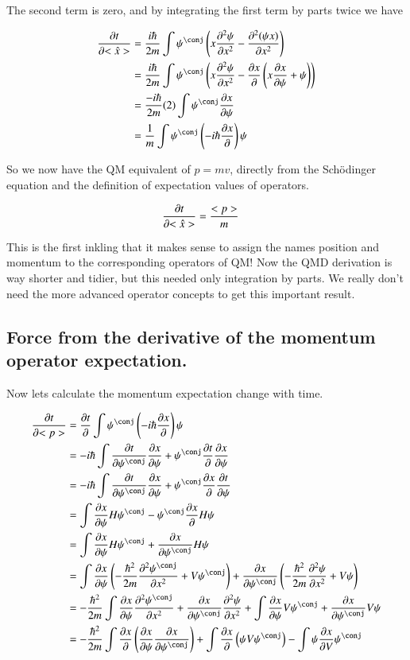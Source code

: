 \documentclass{article}
\newcommand{\PDSq}[2]{\frac{\partial^2 {#2}}{\partial {#1}^2}}
\begin{document}
The second term is zero, and by integrating the first term by parts twice we have

\begin{align*}
\PD{t}{<\hat{x}>}
&= \frac{i\hbar}{2m} \int \psi^\conj \left(x \PDSq{x}{\psi} - \PDSq{x}{(\psi x)} \right) \\
&= \frac{i\hbar}{2m} \int \psi^\conj \left(x \PDSq{x}{\psi} - \PD{x}{}\left(x \PD{x}{\psi} + \psi\right) \right) \\
&= \frac{-i\hbar}{2m} (2) \int \psi^\conj \PD{x}{\psi} \\
&= \frac{1}{m} \int \psi^\conj \left(-i\hbar \PD{x}{} \right) {\psi} \\
\end{align*}

So we now have the QM equivalent of $p = mv$, directly from the Sch\"{o}dinger equation and the definition of expectation values
of operators.

\begin{align}
\frac{\partial{t}}{\partial {<\hat{x}>}} &= \frac{<p>}{m} 
\end{align}

This is the first inkling that it makes sense to assign the names position and momentum to the corresponding operators
of QM!  Now the QMD derivation is way shorter and tidier, but this needed only integration by parts.  We really don't
need the more advanced operator concepts to get this important result.  

\subsection{ Force from the derivative of the momentum operator expectation. }

Now lets calculate the momentum expectation change with time.

\begin{align*}
\PD{t}{<p>} 
&= \PD{t}{} \int \psi^\conj \left(-i \hbar \PD{x}{}\right) \psi \\
&= -i \hbar \int \PD{t}{\psi^\conj} \PD{x}{\psi} +{\psi^\conj} \PD{t}{}\PD{x}{\psi} \\
&= -i \hbar \int \PD{t}{\psi^\conj} \PD{x}{\psi} +{\psi^\conj} \PD{x}{}\PD{t}{\psi} \\
&= \int \PD{x}{\psi} H \psi^\conj - {\psi^\conj} \PD{x}{} H\psi \\
&= \int \PD{x}{\psi} H \psi^\conj + \PD{x}{\psi^\conj} H\psi \\
&= 
\int \PD{x}{\psi} \left(- \frac{\hbar^2}{2m} \PDSq{x}{\psi^\conj} + V\psi^\conj \right)
+ \PD{x}{\psi^\conj} \left(- \frac{\hbar^2}{2m} \PDSq{x}{\psi} + V\psi \right) 
\\
&= 
-
\frac{\hbar^2}{2m} 
\int \PD{x}{\psi} \PDSq{x}{\psi^\conj} + \PD{x}{\psi^\conj} \PDSq{x}{\psi} 
+\int \PD{x}{\psi} V\psi^\conj + \PD{x}{\psi^\conj} V\psi 
\\
&= 
- \frac{\hbar^2}{2m} \int \PD{x}{}\left(\PD{x}{\psi} \PD{x}{\psi^\conj}\right)
+\int \PD{x}{} \left( \psi V\psi^\conj \right) -\int \psi \PD{x}{V} \psi^\conj 
\\
\end{align*}
\end{document}
